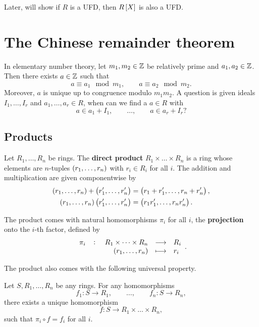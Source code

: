 Later, will show if $ R $ is a UFD, then $ R\sbr{X} $ is also a UFD.

\pagebreak

\section{The Chinese remainder theorem}

In elementary number theory, let $ m_1, m_2 \in \mathbb{Z} $ be relatively prime and $ a_1, a_2 \in \mathbb{Z} $. Then there exists $ a \in \mathbb{Z} $ such that
$$ a \equiv a_1 \mod m_1, \qquad a \equiv a_2 \mod m_2. $$
Moreover, $ a $ is unique up to congruence modulo $ m_1m_2 $. A question is given ideals $ I_1, \dots, I_r $ and $ a_1, \dots, a_r \in R $, when can we find a $ a \in R $ with
$$ a \in a_1 + I_1, \qquad \dots, \qquad a \in a_r + I_r? $$

\subsection{Products}

\begin{definition}
Let $ R_1, \dots, R_n $ be rings. The \textbf{direct product} $ R_1 \times \dots \times R_n $ is a ring whose elements are $ n $-tuples $ \br{r_1, \dots, r_n} $ with $ r_i \in R_i $ for all $ i $. The addition and multiplication are given componentwise by
\begin{align*}
\br{r_1, \dots, r_n} + \br{r_1', \dots, r_n'} & = \br{r_1 + r_1', \dots, r_n + r_n'}, \\
\br{r_1, \dots, r_n}\br{r_1', \dots, r_n'} & = \br{r_1r_1', \dots, r_nr_n'}.
\end{align*}
\end{definition}

\begin{note*}
The product comes with natural homomorphisms $ \pi_i $ for all $ i $, the \textbf{projection} onto the $ i $-th factor, defined by
$$ \function[\pi_i]{R_1 \times \dots \times R_n}{R_i}{\br{r_1, \dots, r_n}}{r_i}. $$
\end{note*}

The product also comes with the following universal property.

\begin{theorem}
Let $ S, R_1, \dots, R_n $ be any rings. For any homomorphisms
$$ f_1 : S \to R_1, \qquad \dots, \qquad f_n : S \to R_n, $$
there exists a unique homomorphism
$$ f : S \to R_1 \times \dots \times R_n, $$
such that $ \pi_i \circ f = f_i $ for all $ i $.
\end{theorem}

